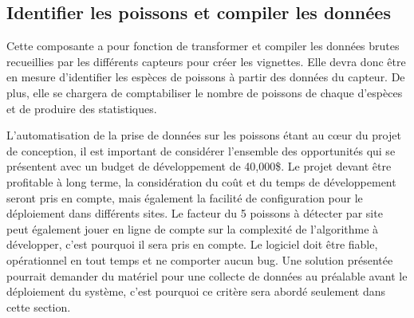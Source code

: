 \begin{table}[!htb]
\footnotesize
\centering
{}
\caption{Évaluation globale des concepts pour l'acheminer des données brutes}
\label{t:Decision_acheminer}
\end{table}
 

\subsection{Identifier les poissons et compiler les données}

Cette composante a pour fonction de transformer et compiler les données brutes recueillies par les différents capteurs pour créer les vignettes. Elle devra donc être en mesure d'identifier les espèces de poissons à partir des données du capteur. De plus, elle se chargera de comptabiliser le nombre de poissons de chaque d'espèces et de produire des statistiques.


L’automatisation de la prise de données sur les poissons étant au cœur du projet de conception, il est important de considérer l’ensemble des opportunités qui se présentent avec un budget de développement de 40,000\$. Le projet devant être profitable à long terme, la considération du coût et du temps de développement seront pris en compte, mais également la facilité de configuration pour le déploiement dans différents sites. Le facteur du 5 poissons à détecter par site peut également jouer en ligne de compte sur la complexité de l’algorithme à développer, c’est pourquoi il sera pris en compte. Le logiciel doit être fiable, opérationnel en tout temps et ne comporter aucun bug. Une solution présentée pourrait demander du matériel pour une collecte de données au préalable avant le déploiement du système, c’est pourquoi ce critère sera abordé seulement dans cette section. 


